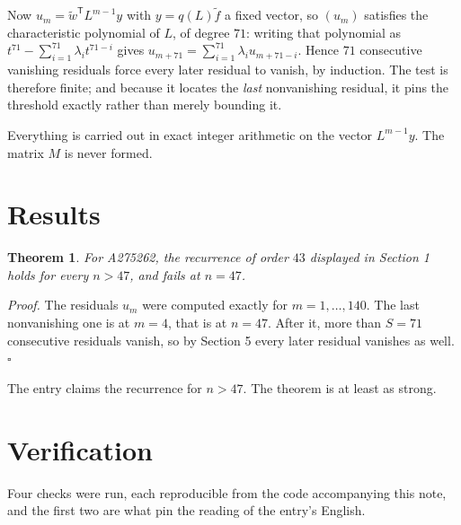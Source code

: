 \documentclass[11pt]{article}
\newtheorem{theorem}{Theorem}
\theoremstyle{definition}
\begin{document}
Now $u_m = \tilde w^{\mathsf T} L^{m-1} y$ with $y = q(L)\tilde f$ a fixed vector, so $(u_m)$ satisfies the characteristic polynomial of $L$, of degree $71$: writing that polynomial as $t^{71} - \sum_{i=1}^{71} \lambda_i t^{71-i}$ gives $u_{m+71} = \sum_{i=1}^{71} \lambda_i u_{m+71-i}$. Hence $71$ consecutive vanishing residuals force every later residual to vanish, by induction. The test is therefore finite; and because it locates the {\itshape last} nonvanishing residual, it pins the threshold exactly rather than merely bounding it.

Everything is carried out in exact integer arithmetic on the vector $L^{m-1}y$. The matrix $M$ is never formed.

\section{Results}

\begin{theorem} For A275262, the recurrence of order $43$ displayed in Section 1 holds for every $n > 47$, and fails at $n = 47$.\end{theorem}

{\itshape Proof.} The residuals $u_m$ were computed exactly for $m = 1,\dots,140$. The last nonvanishing one is at $m = 4$, that is at $n = 47$. After it, more than $S = 71$ consecutive residuals vanish, so by Section 5 every later residual vanishes as well. $\square$

The entry claims the recurrence for $n > 47$. The theorem is at least as strong.

\section{Verification}

Four checks were run, each reproducible from the code accompanying this note, and the first two are what pin the reading of the entry's English.
\end{document}
